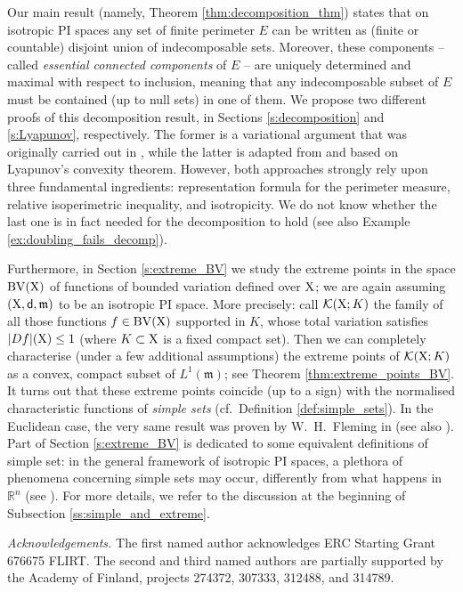\documentclass[reqno]{amsart}
\numberwithin{equation}{section}
\newcommand{\R}{\mathbb{R}}
\newcommand{\X}{{\rm X}}
\newcommand{\sfd}{{\sf d}}
\newcommand{\mm}{\mathfrak m}
\newcommand{\1}{\mathbbm 1}
\newcommand{\BV}{{\rm BV}}
\begin{document}
Our main result (namely, Theorem \ref{thm:decomposition_thm}) states that on
isotropic PI spaces any set of finite perimeter \(E\) can be written as (finite
or countable) disjoint union of indecomposable sets. Moreover, these components
-- called \emph{essential connected components} of \(E\) -- are uniquely determined
and maximal with respect to inclusion, meaning that any indecomposable subset of
\(E\) must be contained (up to null sets) in one of them. We propose
two different proofs of this decomposition result, in Sections \ref{s:decomposition}
and \ref{s:Lyapunov}, respectively. The former is a variational argument
that was originally carried out in \cite{ACMM01}, while the latter is adapted
from \cite{Kirchheim98} and based on Lyapunov's convexity theorem.
However, both approaches strongly rely upon three fundamental ingredients:
representation formula for the perimeter measure, relative isoperimetric
inequality, and isotropicity. We do not know whether the last one is in fact needed
for the decomposition to hold (see also Example \ref{ex:doubling_fails_decomp}).

Furthermore, in Section \ref{s:extreme_BV} we study the extreme points in the
space \(\BV(\X)\) of functions of bounded variation defined over \(\X\);
we are again assuming \((\X,\sfd,\mm)\) to be an isotropic PI space. More precisely:
call \(\mathcal K(\X;K)\) the family of all those functions \(f\in\BV(\X)\)
supported in \(K\), whose total variation satisfies \(|Df|(\X)\leq 1\) (where
\(K\subset\X\) is a fixed compact set). Then we can completely characterise
(under a few additional assumptions) the extreme points of \(\mathcal K(\X;K)\)
as a convex, compact subset of \(L^1(\mm)\); see Theorem \ref{thm:extreme_points_BV}.
It turns out that these extreme points coincide (up to a sign) with the normalised
characteristic functions of \emph{simple sets} (cf.\ Definition \ref{def:simple_sets}).
In the Euclidean case, the very same result was proven by W.\ H.\ Fleming
in \cite{Fleming57,Fleming60} (see also \cite{BG19}). Part of Section \ref{s:extreme_BV} is dedicated to
some equivalent definitions of simple set: in the general framework of isotropic PI
spaces, a plethora of phenomena concerning simple sets may occur, differently from
what happens in \(\R^n\) (see \cite{ACMM01}). For more details,
we refer to the discussion at the beginning of Subsection \ref{ss:simple_and_extreme}.
%
%
\medskip

\noindent\textit{Acknowledgements.}
The first named author acknowledges ERC Starting Grant 676675 FLIRT.
The second and third named authors are partially supported by the
Academy of Finland, projects 274372, 307333, 312488, and 314789.
%
%
%
\end{document}
